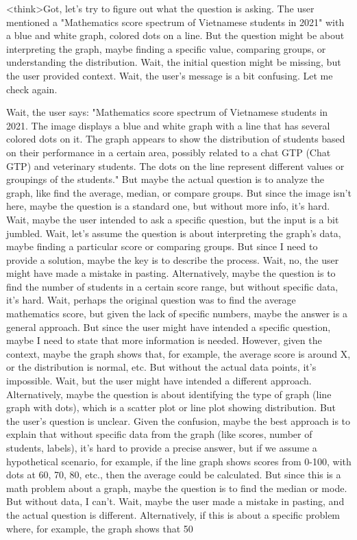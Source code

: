 <think>Got, let's try to figure out what the question is asking. The user mentioned a "Mathematics score spectrum of Vietnamese students in 2021" with a blue and white graph, colored dots on a line. But the question might be about interpreting the graph, maybe finding a specific value, comparing groups, or understanding the distribution. Wait, the initial question might be missing, but the user provided context. Wait, the user's message is a bit confusing. Let me check again.

Wait, the user says: "Mathematics score spectrum of Vietnamese students in 2021. The image displays a blue and white graph with a line that has several colored dots on it. The graph appears to show the distribution of students based on their performance in a certain area, possibly related to a chat GTP (Chat GTP) and veterinary students. The dots on the line represent different values or groupings of the students." But maybe the actual question is to analyze the graph, like find the average, median, or compare groups. But since the image isn't here, maybe the question is a standard one, but without more info, it's hard. Wait, maybe the user intended to ask a specific question, but the input is a bit jumbled. Wait, let's assume the question is about interpreting the graph's data, maybe finding a particular score or comparing groups. But since I need to provide a solution, maybe the key is to describe the process. Wait, no, the user might have made a mistake in pasting. Alternatively, maybe the question is to find the number of students in a certain score range, but without specific data, it's hard. Wait, perhaps the original question was to find the average mathematics score, but given the lack of specific numbers, maybe the answer is a general approach. But since the user might have intended a specific question, maybe I need to state that more information is needed. However, given the context, maybe the graph shows that, for example, the average score is around X, or the distribution is normal, etc. But without the actual data points, it's impossible. Wait, but the user might have intended a different approach. Alternatively, maybe the question is about identifying the type of graph (line graph with dots), which is a scatter plot or line plot showing distribution. But the user's question is unclear. Given the confusion, maybe the best approach is to explain that without specific data from the graph (like scores, number of students, labels), it's hard to provide a precise answer, but if we assume a hypothetical scenario, for example, if the line graph shows scores from 0-100, with dots at 60, 70, 80, etc., then the average could be calculated. But since this is a math problem about a graph, maybe the question is to find the median or mode. But without data, I can't. Wait, maybe the user made a mistake in pasting, and the actual question is different. Alternatively, if this is about a specific problem where, for example, the graph shows that 50%